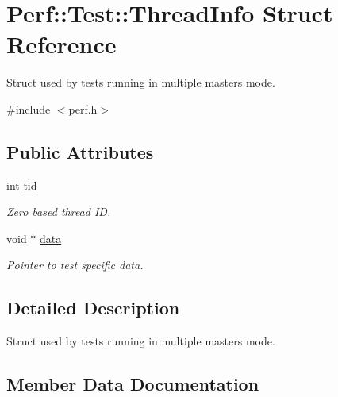 \hypertarget{structPerf_1_1Test_1_1ThreadInfo}{}\section{Perf\+:\+:Test\+:\+:Thread\+Info Struct Reference}
\label{structPerf_1_1Test_1_1ThreadInfo}


Struct used by tests running in multiple masters mode.  




{\ttfamily \#include $<$perf.\+h$>$}

\subsection*{Public Attributes}
\begin{DoxyCompactItemize}
\item 
\hypertarget{structPerf_1_1Test_1_1ThreadInfo_a0b6e5c62871aa6fe92158e04786b2681}{}int \hyperlink{structPerf_1_1Test_1_1ThreadInfo_a0b6e5c62871aa6fe92158e04786b2681}{tid}\label{structPerf_1_1Test_1_1ThreadInfo_a0b6e5c62871aa6fe92158e04786b2681}

\begin{DoxyCompactList}\small\item\em Zero based thread I\+D. \end{DoxyCompactList}\item 
void $\ast$ \hyperlink{structPerf_1_1Test_1_1ThreadInfo_ae97b688f7633aadc49feecfc9d0e6425}{data}
\begin{DoxyCompactList}\small\item\em Pointer to test specific data. \end{DoxyCompactList}\end{DoxyCompactItemize}


\subsection{Detailed Description}
Struct used by tests running in multiple masters mode. 

\subsection{Member Data Documentation}
\hypertarget{structPerf_1_1Test_1_1ThreadInfo_ae97b688f7633aadc49feecfc9d0e6425}{}
